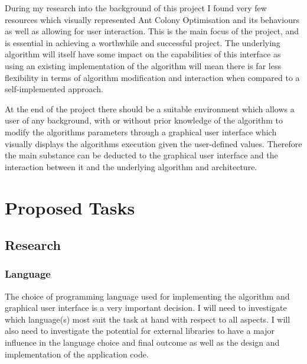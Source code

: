 \documentclass[10pt,a4paper]{article}
\begin{document}
During my research into the background of this project I found very few resources which visually represented Ant Colony Optimisation and its behaviours as well as allowing for user interaction. This is the main focus of the project, and is essential in achieving a worthwhile and successful project. The underlying algorithm will itself have some impact on the capabilities of this interface as using an existing implementation of the algorithm will mean there is far less flexibility in terms of algorithm modification and interaction when compared to a self-implemented approach.


At the end of the project there should be a suitable environment which allows a user of any background, with or without prior knowledge of the algorithm to modify the algorithms parameters through a graphical user interface which visually displays the algorithms execution given the user-defined values. Therefore the main substance can be deducted to the graphical user interface and the interaction between it and the underlying algorithm and architecture.



\section{Proposed Tasks}
	\subsection{Research}
		\subsubsection{Language}
The choice of programming language used for implementing the algorithm and graphical user interface is a very important decision. I will need to investigate which language(s) most suit the task at hand with respect to all aspects. I will also need to investigate the potential for external libraries to have a major influence in the language choice and final outcome as well as the design and implementation of the application code. 
\end{document}
